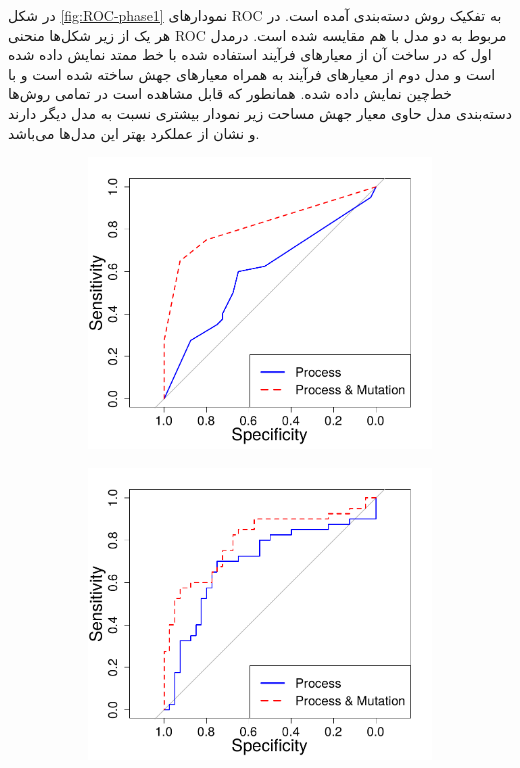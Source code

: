 در شکل \ref{fig:ROC-phase1} نمودارهای ROC به تفکیک روش دسته‌بندی آمده است. در هر یک از زیر شکل‌ها منحنی ROC مربوط به  دو مدل با هم مقایسه شده است. درمدل اول که در ساخت آن از معیارهای فرآیند استفاده شده  با خط ممتد نمایش داده شده است و مدل دوم  از معیارهای فرآیند به همراه معیارهای جهش ساخته شده‌ است  و با خط‌چین نمایش داده شده‌. همانطور که قابل مشاهده است در تمامی روش‌ها دسته‌بندی مدل‌ حاوی معیار جهش مساحت زیر نمودار بیشتری نسبت به مدل دیگر دارند و نشان از عملکرد بهتر این مدل‌ها می‌باشد. 
\begin{figure}[H]
	\begin{subfigure}{.5\textwidth}
		\centering
		\includegraphics[width=\linewidth]{img/evaluation/phase1-roc-dt.pdf}
		\caption{}
	\end{subfigure}
	\begin{subfigure}{.5\textwidth}
	\centering
	\includegraphics[width=\linewidth]{img/evaluation/phase1-roc-svm.pdf}

\end{subfigure}
\end{figure}
